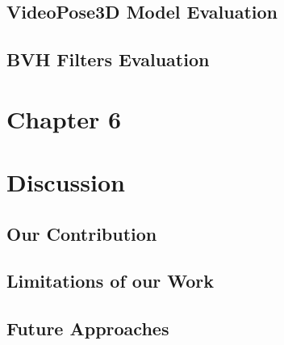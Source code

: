\documentclass[12pt,oneside,a4paper,english]{article}
\begin{document}
\subsection{VideoPose3D Model Evaluation}

\subsection{BVH Filters Evaluation}


\newpage
\section*{Chapter 6 \\}
\section{Discussion}

\subsection{Our Contribution}

\subsection{Limitations of our Work}

\subsection{Future Approaches}


\newpage
 

\label{EndOfText}

\label{endOfDoc}
\end{document}
